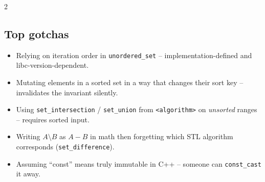 \documentclass[10pt]{article}
\begin{document}
\begin{multicols}{2}
\subsection*{Top gotchas}
\begin{itemize}
    \item Relying on iteration order in \texttt{unordered\_set} --
    implementation-defined and libc-version-dependent.
    \item Mutating elements in a sorted set in a way that changes
    their sort key -- invalidates the invariant silently.
    \item Using \texttt{set\_intersection} / \texttt{set\_union} from
    \texttt{<algorithm>} on \emph{unsorted} ranges -- requires
    sorted input.
    \item Writing $A \setminus B$ as $A - B$ in math then forgetting
    which STL algorithm corresponds
    (\texttt{set\_difference}).
    \item Assuming ``const'' means truly immutable in C++ -- someone
    can \texttt{const\_cast} it away.
\end{itemize}

\end{multicols}
\end{document}

